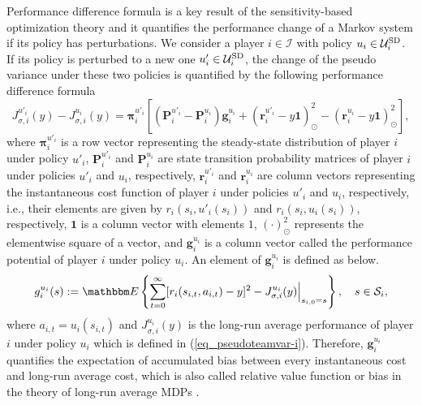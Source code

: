 \documentclass[12pt]{article}
\begin{document}
Performance difference formula is a key result of the
sensitivity-based optimization theory and it quantifies the
performance change of a Markov system if its policy has
perturbations. We consider a player $i \in \mathcal I$ with policy
$u_i \in \mathcal U^{\rm SD}_i$. If its policy is perturbed to a new
one $u'_i \in \mathcal U^{\rm SD}_i$, the change of the pseudo
variance under these two policies is quantified by the following
performance difference formula \citep{Cao07}
\begin{equation}\label{eq_diffi}
J^{u'_{i}}_{\sigma,i}(y) - J^{u_{i}}_{\sigma,i}(y) = \bm
\pi^{u'_i}_i[(\bm P^{u'_i}_i - \bm P^{u_i}_i)\bm g^{u_i}_i + (\bm
r^{u'_i}_i - y \bm 1)^2_{\odot} - (\bm r^{u_i}_i - y \bm
1)^2_{\odot}],
\end{equation}
where $\bm \pi^{u'_i}_i$ is a row vector representing the
steady-state distribution of player $i$ under policy $u'_i$, $\bm
P^{u'_i}_i$ and $\bm P^{u_i}_i$ are state transition probability
matrices of player $i$ under policies $u'_i$ and $u_i$,
respectively, $\bm r^{u'_i}_i$ and $\bm r^{u_i}_i$ are column
vectors representing the instantaneous cost function of player $i$
under policies $u'_i$ and $u_i$, respectively, i.e., their elements
are given by $r_i(s_i,u'_i(s_i))$ and $r_i(s_i,u_i(s_i))$,
respectively, $\bm 1$ is a column vector with elements $1$,
$(\cdot)^2_{\odot}$ represents the elementwise square of a vector,
and $\bm g^{u_i}_i$ is a column vector called the performance
potential of player $i$ under policy $u_i$. An element of $\bm
g^{u_i}_i$ is defined as below.
\begin{equation}\label{eq_bias}
g_i^{u_i}(s) := \mathbbm E \left\{ \sum_{t=0}^{\infty}
[r_i(s_{i,t},a_{i,t}) - y]^2 - J^{u_{i}}_{\sigma,i}(y)
\Big|_{s_{i,0}=s} \right\}, \quad s \in \mathcal S_i,
\end{equation}
where $a_{i,t} = u_i(s_{i,t})$ and $J^{u_{i}}_{\sigma,i}(y)$ is the
long-run average performance of player $i$ under policy $u_i$ which
is defined in (\ref{eq_pseudoteamvar-i}). Therefore, $\bm g^{u_i}_i$
quantifies the expectation of accumulated bias between every
instantaneous cost and long-run average cost, which is also called
relative value function or bias in the theory of long-run average
MDPs \citep{Puterman94}.
\end{document}
